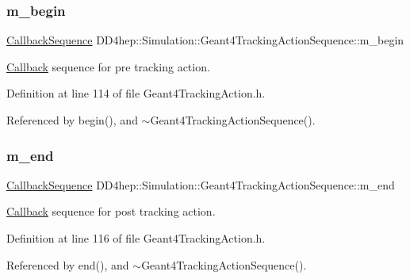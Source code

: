 \subsubsection{\texorpdfstring{m\+\_\+begin}{m\_begin}}
{\footnotesize\ttfamily \hyperlink{struct_d_d4hep_1_1_callback_sequence}{Callback\+Sequence} D\+D4hep\+::\+Simulation\+::\+Geant4\+Tracking\+Action\+Sequence\+::m\+\_\+begin\hspace{0.3cm}{\ttfamily [protected]}}



\hyperlink{class_d_d4hep_1_1_callback}{Callback} sequence for pre tracking action. 



Definition at line 114 of file Geant4\+Tracking\+Action.\+h.



Referenced by begin(), and $\sim$\+Geant4\+Tracking\+Action\+Sequence().

\hypertarget{class_d_d4hep_1_1_simulation_1_1_geant4_tracking_action_sequence_ae7d724d09c2f2cd087d72bd448b41f79}{}\label{class_d_d4hep_1_1_simulation_1_1_geant4_tracking_action_sequence_ae7d724d09c2f2cd087d72bd448b41f79} 
\subsubsection{\texorpdfstring{m\+\_\+end}{m\_end}}
{\footnotesize\ttfamily \hyperlink{struct_d_d4hep_1_1_callback_sequence}{Callback\+Sequence} D\+D4hep\+::\+Simulation\+::\+Geant4\+Tracking\+Action\+Sequence\+::m\+\_\+end\hspace{0.3cm}{\ttfamily [protected]}}



\hyperlink{class_d_d4hep_1_1_callback}{Callback} sequence for post tracking action. 



Definition at line 116 of file Geant4\+Tracking\+Action.\+h.



Referenced by end(), and $\sim$\+Geant4\+Tracking\+Action\+Sequence().

\hypertarget{class_d_d4hep_1_1_simulation_1_1_geant4_tracking_action_sequence_abaca2784eae1ab5e30a742819e61b3be}{}\label{class_d_d4hep_1_1_simulation_1_1_geant4_tracking_action_sequence_abaca2784eae1ab5e30a742819e61b3be} 
